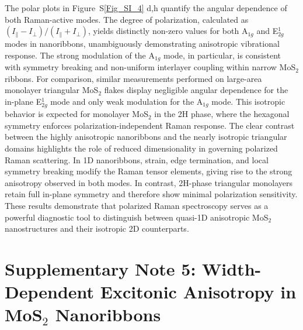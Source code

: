 \documentclass[journal=jacsnano,manuscript=article]{achemso}
\begin{document}
The polar plots in Figure~S\ref {Fig_SI_4} d,h quantify the angular dependence of both Raman-active modes. The degree of polarization, calculated as $(I_{\parallel}-I_{\perp})/(I_{\parallel}+I_{\perp})$, yields distinctly non-zero values for both A$_{1g}$ and E$^{1}_{2g}$ modes in nanoribbons, unambiguously demonstrating anisotropic vibrational response. The strong modulation of the A$_{1g}$ mode, in particular, is consistent with symmetry breaking and non-uniform interlayer coupling within narrow MoS$_2$ ribbons.
For comparison, similar measurements performed on large-area monolayer triangular MoS$_2$ flakes display negligible angular dependence for the in-plane E$^{1}_{2g}$ mode and only weak modulation for the A$_{1g}$ mode. This isotropic behavior is expected for monolayer MoS$_2$ in the 2H phase, where the hexagonal symmetry enforces polarization-independent Raman response.
The clear contrast between the highly anisotropic nanoribbons and the nearly isotropic triangular domains highlights the role of reduced dimensionality in governing polarized Raman scattering. In 1D nanoribbons, strain, edge termination, and local symmetry breaking modify the Raman tensor elements, giving rise to the strong anisotropy observed in both modes. In contrast, 2H-phase triangular monolayers retain full in-plane symmetry and therefore show minimal polarization sensitivity. These results demonstrate that polarized Raman spectroscopy serves as a powerful diagnostic tool to distinguish between quasi-1D anisotropic MoS$_2$ nanostructures and their isotropic 2D counterparts.

\section {Supplementary Note 5: Width-Dependent Excitonic Anisotropy in MoS$_2$ Nanoribbons}
\end{document}
